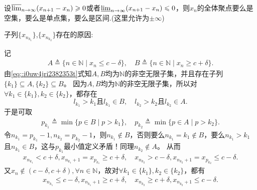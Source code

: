 \documentclass[../../main.tex]{subfiles}
\begin{document}
\begin{lemma}[稠密聚点引理]\label{lemma:稠密聚点引理}
设\( \varlimsup_{n \to \infty} (x_{n+1} - x_n) \geqslant 0 \)或者\( \varliminf_{n \to \infty} (x_{n+1} - x_n) \leqslant 0 \)，则\( x_n \)的全体聚点要么是空集，要么是单点集，要么是区间.(这里允许为\( \pm \infty \))
\end{lemma}
\begin{note}
\hypertarget{n1n2子列存在的原因}{子列$\{x_{n_{k_1}}\}$,$\{x_{n_{k_2}}\}$存在的原因:}记
\begin{align*}
A \triangleq \{ n \in \mathbb{N} \mid x_n \leqslant c - \delta \}, \quad B \triangleq \{ n \in \mathbb{N} \mid x_n \geqslant c + \delta \}.
\end{align*}
由\eqref{eq::i0uw4jri2382353t}式知\( A, B \)均为\( \mathbb{N} \)的非空无限子集，并且存在子列\( \{ k_1 \} \subseteq A, \{ k_2 \} \subseteq B \)。
因为\( A, B \)均为\( \mathbb{N} \)的非空无限子集，所以对\( \forall k_1 \in \{ k_1 \}, k_2 \in \{ k_2 \} \)，都存在
\[
l_{k_1} > k_1 \text{且} l_{k_1} \in B, \quad l_{k_2} > k_2 \text{且} l_{k_2} \in A.
\]
于是可取
\begin{align*}
p_{k_1} \triangleq \min \{ p \in B \mid p > k_1 \}, \quad p_{k_2} \triangleq \min \{ p \in A \mid p > k_2 \}.
\end{align*}
令\( n_{k_1} = p_{k_1} - 1, n_{k_2} = p_{k_2} - 1 \)，则\( n_{k_1} \notin B \)，否则要么\( n_{k_1} = k_1 \notin B \)，要么\( n_{k_1} > k_1 \)且\( n_{k_1} \in B \)，这与\( p_{k_1} \)最小值定义矛盾！同理\( n_{k_2} \notin A \)。
从而
\begin{align*}
x_{n_{k_1}} < c + \delta, x_{n_{k_1} + 1} = x_{p_{k_1}} \geqslant c + \delta, \quad x_{n_{k_2}} > c - \delta, x_{n_{k_2} + 1} = x_{p_{k_2}} \leqslant c - \delta.
\end{align*}
又\( x_n \notin (c - \delta, c + \delta), \forall n \in \mathbb{N} \)，故对\( \forall k_1 \in \{ k_1 \}, k_2 \in \{ k_2 \} \)，都有
\begin{align*}
x_{n_{k_1}} \leqslant c - \delta, x_{n_{k_1} + 1} \geqslant c + \delta, \quad x_{n_{k_2}} \geqslant c + \delta, x_{n_{k_2} + 1} \leqslant c - \delta.
\end{align*}
\end{note}
\end{document}
